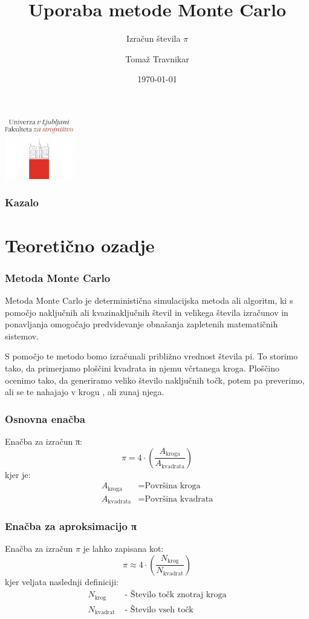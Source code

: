 \documentclass{beamer}
\title{Uporaba metode Monte Carlo}
\subtitle{Izračun števila $\pi$}
\author{Tomaž Travnikar}
\institute{Univerza v Ljubljani Fakulteta za strojništvo}
\date{\today}
\begin{document}
\begin{frame}
  \centering
  \includegraphics[width=3cm]{ULFS_logotip.jpg} %
  \vspace{1cm} %
  \titlepage
\end{frame}

\begin{frame}
  \frametitle{Kazalo}
  \tableofcontents
\end{frame}

\section{Teoretično ozadje}
\begin{frame}
  \frametitle{Metoda Monte Carlo}
  Metoda Monte Carlo je deterministična simulacijska metoda ali algoritm, ki s pomočjo naključnih ali kvazinaključnih števil in velikega števila izračunov in ponavljanja omogočajo predvidevanje obnašanja zapletenih matematičnih sistemov.
  \pause

  
  S pomočjo te metodo bomo izračunali približno vrednost števila pi. To storimo tako, da primerjamo ploščini kvadrata in njemu včrtanega kroga. Ploščino ocenimo tako, da generiramo veliko število naključnih točk, potem pa preverimo, ali se te nahajajo v krogu , ali zunaj njega.
  \end{frame}
  
\begin{frame}
  \frametitle{Osnovna enačba}
  Enačba za izračun π:
  \begin{equation}
    \pi = 4 \cdot \left(\frac{A_{\text{kroga}}}{A_{\text{kvadrata}}}\right)
  \end{equation}
  kjer je:
  \begin{align*}
    A_{\text{kroga}} &= \text{Površina kroga} \\
    A_{\text{kvadrata}} &= \text{Površina kvadrata}
  \end{align*}
\end{frame}

\begin{frame}
  \frametitle{Enačba za aproksimacijo π}
  Enačba za izračun $\pi$ je lahko zapisana kot:
  \begin{equation}
    \pi \approx 4 \cdot \left(\frac{N_{\text{krog}}}{N_{\text{kvadrat}}}\right)
  \end{equation}
  kjer veljata naslednji definiciji:
  \begin{align*}
    N_{\text{krog}} &\text{ - Število točk znotraj kroga} \\
    N_{\text{kvadrat}} &\text{ - Število vseh točk}
  \end{align*}
\end{frame}
\end{document}
